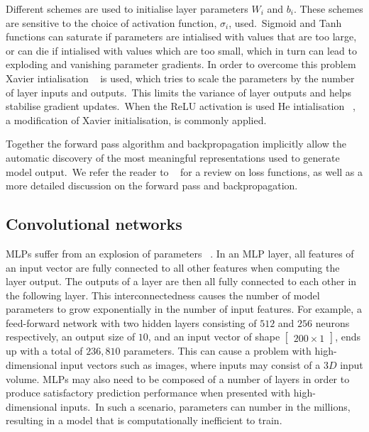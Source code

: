 \medskip
\noindent Different schemes are used to initialise layer parameters $ W_i $ and $ b_i $. These schemes are sensitive to the choice of activation function, $ \sigma_i $, used.\ Sigmoid and Tanh functions can saturate if parameters are intialised with values that are too large, or can die if intialised with values which are too small, which in turn can lead to exploding and vanishing parameter gradients. In order to overcome this problem Xavier intialisation \unskip ~\citep{glorot2010understanding} is used, which tries to scale the parameters by the number of layer inputs and outputs.\ This limits the variance of layer outputs and helps stabilise gradient updates.\ When the ReLU activation is used He intialisation \unskip ~\citep{he2015delving}, a modification of Xavier initialisation, is commonly applied. \par

\noindent Together the forward pass algorithm and backpropagation implicitly allow the automatic discovery of the most meaningful representations used to generate model output.\ We refer the reader to \unskip ~\citep{Goodfellow-et-al-2016} for a review on loss functions, as well as a more detailed discussion on the forward pass and backpropagation. 



\subsection{Convolutional networks}

MLPs suffer from an explosion of parameters \unskip ~\citep{krizhevsky2012imagenet}. In an MLP layer, all features of an input vector are fully connected to all other features when computing the layer output. The outputs of a layer are then all fully connected to each other in the following layer. This interconnectedness causes the number of model parameters to grow exponentially in the number of input features. For example, a feed-forward network with two hidden layers consisting of $ 512 $ and $ 256 $ neurons respectively, an output size of $10$, and an input vector of shape $ \left [ \begin{matrix} 200 \times 1 \end{matrix} \right] $, ends up with a total of $ 236,810 $ parameters. This can cause a problem with high-dimensional input vectors such as images, where inputs may consist of a $ 3D $ input volume. MLPs may also need to be composed of a number of layers in order to produce satisfactory prediction performance when presented with high-dimensional inputs.\ In such a scenario, parameters can number in the millions, resulting in a model that is computationally inefficient to train. \par

